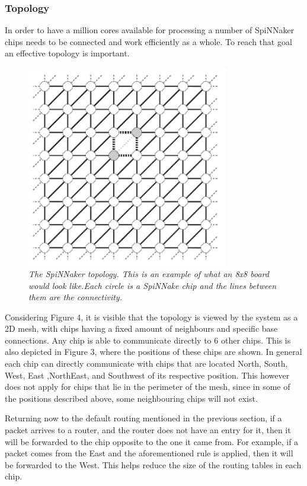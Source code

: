 \documentclass[12pt,a4paper]{article}
\begin{document}
\subsubsection{Topology}
In order to have a million cores available for processing a number of SpiNNaker chips needs to be connected and work efficiently as a whole. To reach that goal an effective topology is important.
\begin{figure}[h!]
\includegraphics[width=250pt,height=250pt,scale=2]{Pics/topology.png}
\centering
\caption{
\emph{The SpiNNaker topology\cite{navaridas2009understanding}. This is an example of what an 8x8 board would look like.Each circle is a SpiNNake chip and the lines between them are the connectivity.}}
\end{figure}

Considering Figure 4, it is visible that the topology is viewed by the system as a 2D mesh, with chips having a fixed amount of neighbours and specific base connections. Any chip is able to communicate directly to 6 other chips. This is also depicted in Figure 3, where the positions of these chips are shown. In general each chip can directly communicate with chips that are located North, South, West, East ,NorthEast, and Southwest of its respective position. This however does not apply for chips that lie in the perimeter of the mesh, since in some of the positions described above, some neighbouring chips will not exist\cite{furber2012overview}. 

Returning now to the default routing mentioned in the previous section, if a packet arrives to a router, and the router does not have an entry for it, then it will be forwarded to the chip opposite to the one it came from. For example, if a packet comes from the East and the aforementioned rule is applied, then it will be forwarded to the West. This helps reduce the size of the routing tables in each chip\cite{khan2008spinnaker}.
\end{document}
